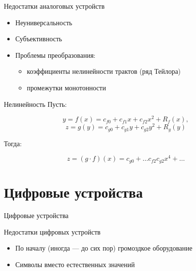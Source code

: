 \documentclass[xetex,aspectratio=43]{beamer}
\begin{document}
\begin{frame}{Недостатки аналоговых устройств}
	\begin{itemize}

		\item
		Неуниверсальность
		\item
		Субъективность
		\item
		Проблемы преобразования:

		\begin{itemize}

			\item
			коэффициенты нелинейности трактов (ряд Тейлора)
			\item
			промежутки монотонности
		\end{itemize}
	\end{itemize}
\end{frame}

\begin{frame}{Нелинейность}
	Пусть:

	\[y = f(x) = c_{f0} + c_{f1} x + c_{f2} x^2 + R_f(x),\]
	\[z = g(y) = c_{g0} + c_{g1} y + c_{g2} y^2 + R_g(y)\]

	Тогда:

	\[ z = (g\cdot f)(x) = c_{g0} + \dots c_{f2} c_{g2} x^4 + \dots \]

	\begin{center}
		
	\end{center}
\end{frame}

\section{Цифровые устройства}

\begin{frame}{Цифровые устройства}
\end{frame}

\begin{frame}{Недостатки цифровых устройств}
	\begin{itemize}

		\item
		По началу (иногда --- до сих пор) громоздкое оборудование
		\item
		Символы вместо естественных значений
	\end{itemize}
\end{frame}
\end{document}
